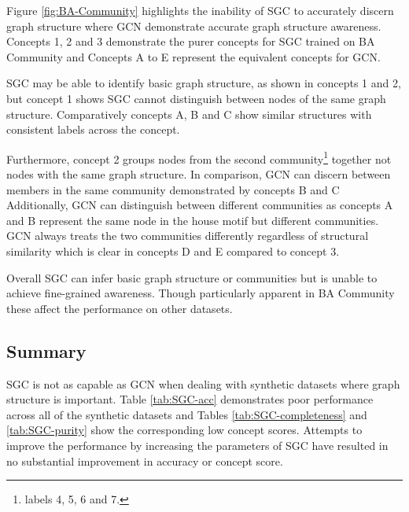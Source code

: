 Figure \ref{fig:BA-Community} highlights the inability of SGC to accurately discern graph structure where GCN demonstrate accurate graph structure awareness.
Concepts 1, 2 and 3 demonstrate the purer concepts for SGC trained on BA Community and Concepts A to E represent the equivalent concepts for GCN.

SGC may be able to identify basic graph structure, as shown in concepts 1 and 2, but concept 1 shows SGC cannot distinguish between nodes of the same graph structure.
Comparatively concepts A, B and C show similar structures with consistent labels across the concept.

Furthermore, concept 2 groups nodes from the second community\footnote{labels 4, 5, 6 and 7.} together not nodes with the same graph structure.
In comparison, GCN can discern between members in the same community demonstrated by concepts B and C
Additionally, GCN can distinguish between different communities as concepts A and B represent the same node in the house motif but different communities.
GCN always treats the two communities differently regardless of structural similarity which is clear in concepts D and E compared to concept 3.

Overall SGC can infer basic graph structure or communities but is unable to achieve fine-grained awareness.
Though particularly apparent in BA Community these affect the performance on other datasets.

\subsection{Summary}

SGC is not as capable as GCN when dealing with synthetic datasets where graph structure is important.
Table \ref{tab:SGC-acc} demonstrates poor performance across all of the synthetic datasets and Tables \ref{tab:SGC-completeness} and \ref{tab:SGC-purity} show the corresponding low concept scores.
Attempts to improve the performance by increasing the parameters of SGC have resulted in no substantial improvement in accuracy or concept score.

